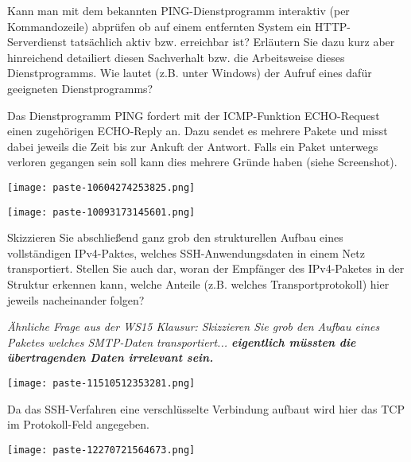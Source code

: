 \documentclass{article}
\begin{document}
\begin{tcolorbox}[colback=white!10!white,colframe=lightgray!75!black,
  savelowerto=\jobname_ex.tex,breakable,enhanced,lines before break=40]

\justifying
Kann man mit dem bekannten PING-Dienstprogramm interaktiv (per Kommandozeile) abprüfen ob auf einem entfernten System ein HTTP-Serverdienst tatsächlich aktiv bzw. erreichbar ist? Erläutern Sie dazu kurz aber hinreichend detailiert diesen Sachverhalt bzw. die Arbeitsweise dieses Dienstprogramms. Wie lautet (z.B. unter Windows) der Aufruf eines dafür geeigneten Dienstprogramms?

\tcblower

\justifying
Das Dienstprogramm PING fordert mit der ICMP-Funktion ECHO-Request einen zugehörigen ECHO-Reply an. Dazu sendet es mehrere Pakete und misst dabei jeweils die Zeit bis zur Ankuft der Antwort. Falls ein Paket unterwegs verloren gegangen sein soll kann dies mehrere Gründe haben (siehe Screenshot).\begin{center}
\texttt{[image: paste-10604274253825.png]}
\end{center}
\begin{center}
\texttt{[image: paste-10093173145601.png]}
\end{center}

\end{tcolorbox}
\begin{tcolorbox}[colback=white!10!white,colframe=lightgray!75!black,
  savelowerto=\jobname_ex.tex,breakable,enhanced,lines before break=40]

\justifying
Skizzieren Sie abschließend ganz grob den strukturellen Aufbau eines vollständigen IPv4-Paktes, welches SSH-Anwendungsdaten in einem Netz transportiert. Stellen Sie auch dar, woran der Empfänger des IPv4-Paketes in der Struktur erkennen kann, welche Anteile (z.B. welches Transportprotokoll) hier jeweils nacheinander folgen?

\tcblower

\justifying
\textit{Ähnliche Frage aus der WS15 Klausur: Skizzieren Sie grob den Aufbau eines Paketes welches SMTP-Daten transportiert... \textbf{eigentlich müssten die übertragenden Daten irrelevant sein.}}\textbf{}\begin{center}
\texttt{[image: paste-11510512353281.png]}
\end{center}
Da das SSH-Verfahren eine verschlüsselte Verbindung aufbaut wird hier das TCP im Protokoll-Feld angegeben.\begin{center}
\texttt{[image: paste-12270721564673.png]}
\end{center}

\end{tcolorbox}
\end{document}
